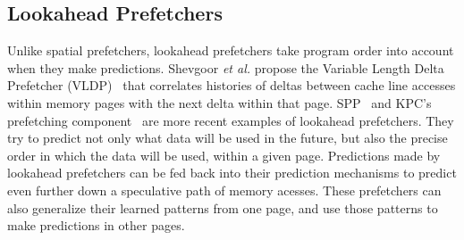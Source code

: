 

\subsection{Lookahead Prefetchers}

Unlike spatial prefetchers, lookahead prefetchers take program order into
account when they make predictions. Shevgoor \textit{et al.} propose the Variable 
Length Delta Prefetcher (VLDP)~\cite{VLDP} that correlates histories of
deltas between cache line accesses within memory pages with the next delta
within that page. SPP~\cite{SPP} and KPC's prefetching component~\cite{KPC} are
more recent examples of lookahead prefetchers. They try to predict not only what
data will be used in the future, but also the precise order in which the data
will be used, within a given page. Predictions made by lookahead prefetchers can
be fed back into their prediction mechanisms to predict even further down 
a speculative path of memory acesses. These prefetchers can also generalize their
learned patterns from one page, and use those patterns to make predictions in 
other pages.


